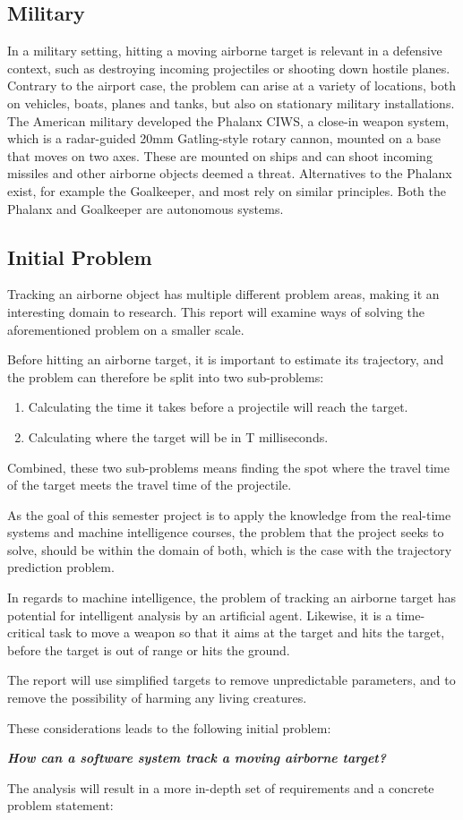 \subsection{Military}
In a military setting, hitting a moving airborne target is relevant in a defensive context, such as destroying incoming projectiles or shooting down hostile planes.
Contrary to the airport case, the problem can arise at a variety of locations, both on vehicles, boats, planes and tanks, but also on stationary military installations.
The American military developed the Phalanx CIWS, a close-in weapon system, which is a radar-guided 20mm Gatling-style rotary cannon, mounted on a base that moves on two axes.
These are mounted on ships and can shoot incoming missiles and other airborne objects deemed a threat.
Alternatives to the Phalanx exist, for example the Goalkeeper, and most rely on similar principles.
Both the Phalanx and Goalkeeper are autonomous systems.

\subsection{Initial Problem}
Tracking an airborne object has multiple different problem areas, making it an interesting domain to research.
This report will examine ways of solving the aforementioned problem on a smaller scale.

Before hitting an airborne target, it is important to estimate its trajectory, and the problem can therefore be split into two sub-problems:
\begin{enumerate}
  \item Calculating the time it takes before a projectile will reach the target.
  \item Calculating where the target will be in T milliseconds.
\end{enumerate}
Combined, these two sub-problems means finding the spot where the travel time of the target meets the travel time of the projectile.

As the goal of this semester project is to apply the knowledge from the real-time systems and machine intelligence courses, the problem that the project seeks to solve, should be within the domain of both, which is the case with the trajectory prediction problem.

In regards to machine intelligence, the problem of tracking an airborne target has potential for intelligent analysis by an artificial agent.
Likewise, it is a time-critical task to move a weapon so that it aims at the target and hits the target, before the target is out of range or hits the ground.

The report will use simplified targets to remove unpredictable parameters, and to remove the possibility of harming any living creatures.

These considerations leads to the following initial problem:
\label{key:initialProblem}
\begin{center}
  \textit{\textbf{How can a software system track a moving airborne target?}}
\end{center}
The analysis will result in a more in-depth set of requirements and a concrete problem statement:
